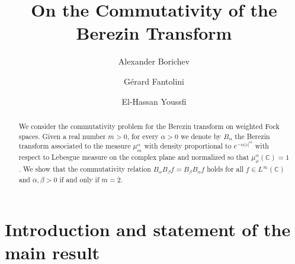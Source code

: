 \documentclass[12pt]{amsart}
\numberwithin{equation}{section}
\theoremstyle{plain}
\numberwithin{equation}{section}
\begin{document}
\title{On the Commutativity of the Berezin Transform}


\author{Alexander Borichev}

\address{Aix-Marseille University, CNRS, I2M, Marseille,
France}


\author{G\'erard Fantolini}

\address{Aix-Marseille University, CNRS, I2M, Marseille,
France.}


\author{El-Hassan Youssfi}

\address{Aix-Marseille University, CNRS, I2M, Marseille,
France.}





 

\begin{abstract}
We consider the commutativity problem for the Berezin transform on weighted Fock spaces. 
Given a real number $m>0$, for every $\alpha >0$ we denote by $B_{\alpha}$ the Berezin transform associated  to the measure  $\mu_{m}^{\alpha}$ 
with density proportional to $e^{-\alpha |z|^m}$ with respect to Lebesgue measure on the complex plane and normalized so that $\mu_{\phi}^{\alpha}(\mathbb C) =1$. 
We show that the commutativity relation $B_{\alpha}B_{\beta}f=B_{\beta}B_{\alpha}f$ holds for all $f\in L^{\infty}(\mathbb C)$ and $\alpha,\beta> 0$  if and only if $m=2$.  \end{abstract}

\maketitle


\section{Introduction and statement of the main result}
\end{document}
